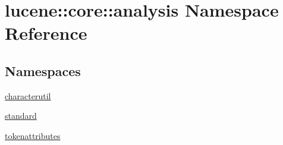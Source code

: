 \hypertarget{namespacelucene_1_1core_1_1analysis}{}\section{lucene\+:\+:core\+:\+:analysis Namespace Reference}
\label{namespacelucene_1_1core_1_1analysis}
\subsection*{Namespaces}
\begin{DoxyCompactItemize}
\item 
 \mbox{\hyperlink{namespacelucene_1_1core_1_1analysis_1_1characterutil}{characterutil}}
\item 
 \mbox{\hyperlink{namespacelucene_1_1core_1_1analysis_1_1standard}{standard}}
\item 
 \mbox{\hyperlink{namespacelucene_1_1core_1_1analysis_1_1tokenattributes}{tokenattributes}}
\end{DoxyCompactItemize}
